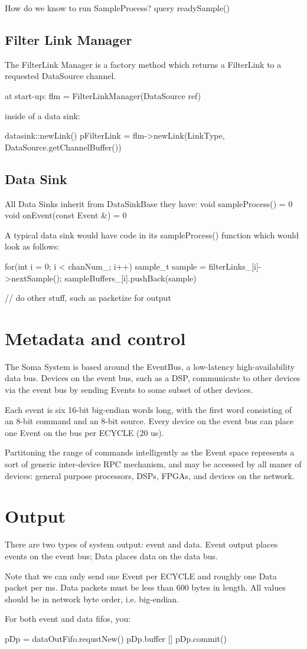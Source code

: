 How do we know to run SampleProcess? query readySample()


\subsection{Filter Link Manager}
The FilterLink Manager is a factory method which returns a FilterLink to a requested DataSource channel. 

at start-up:
  flm = FilterLinkManager(DataSource ref) 
  
inside of a data sink: 

datasink::newLink()
   pFilterLink = flm->newLink(LinkType, DataSource.getChannelBuffer())


\subsection{Data Sink}
All Data Sinks inherit from DataSinkBase
they have: 
  void sampleProcess() = 0 
  void onEvent(const Event &) = 0


A typical data sink would have code in its sampleProcess() function
which would look as follows:

for(int i = 0; i < chanNum_; i++) {
   sample_t sample = filterLinks_[i]->nextSample(); 
   sampleBuffers_[i].pushBack(sample)
}

// do other stuff, such as packetize for output


\section{Metadata and control}
The Soma System is based around the EventBus, a low-latency
high-availability data bus. Devices on the event bus, such as a DSP,
communicate to other devices via the event bus by sending Events to
some subset of other devices.

Each event is six 16-bit big-endian words long, with the first word
consisting of an 8-bit command and an 8-bit source. Every device on
the event bus can place one Event on the bus per ECYCLE (20 us).

Partitoning the range of commands intelligently as the Event space
represents a sort of generic inter-device RPC mechanism, and may be
accessed by all maner of devices: general purpose processors, DSPs,
FPGAs, and devices on the network.


\section{Output} 
There are two types of system output: event and data. Event output
places events on the event bus; Data places data on the data bus.

Note that we can only send one Event per ECYCLE and roughly one Data
packet per ms. Data packets must be less than 600 bytes in length. All
values should be in network byte order, i.e. big-endian. 

For both event and data fifos, you: 

pDp = dataOutFifo.requstNew()
pDp.buffer []
pDp.commit()
